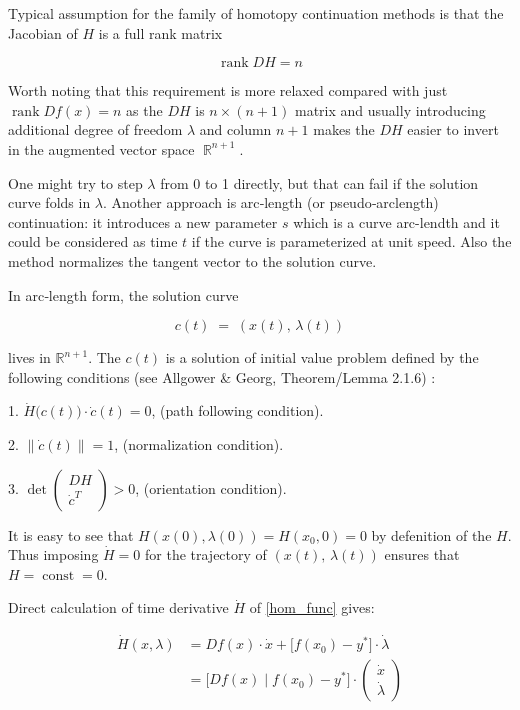 \documentclass[11pt,american]{article}
\DeclareMathOperator{\const}{const}
\DeclareMathOperator{\R}{\mathbb{R}}
\DeclareMathOperator{\rank}{\operatorname{rank}}
\begin{document}
Typical assumption for the family of homotopy continuation methods is that the Jacobian of $H$ is a full rank matrix

\begin{equation}\label{full_rank_H}
\rank D H = n
\end{equation}

Worth noting that this requirement is more relaxed compared with just $\rank D f(x) = n$ as the $D H$ is $n\times(n+1)$ matrix and usually introducing additional degree of freedom $\lambda$ and column $n+1$ makes the $D H$ easier to invert in the augmented vector space $\R^{n+1}$.

One might try to step $\lambda$ from 0 to 1 directly, but that can fail if the solution curve folds in $\lambda$.  
Another approach is arc‐length (or pseudo‐arclength) continuation: it introduces a new parameter $s$ which is a curve arc-lendth and it could be considered as time $t$ if the curve is parameterized at unit speed. Also the method normalizes the tangent vector to the solution curve.

In arc‐length form, the solution curve

\begin{equation}
c(t) \;=\; (x(t),\,\lambda(t))
\end{equation}

lives in $\mathbb{R}^{n+1}$. The $c(t)$ is a solution of initial value problem defined by the following conditions (see Allgower \& Georg, Theorem/Lemma 2.1.6) :

1. $ \dot H\bigl(c(t)\bigr) \cdot \dot{c}(t) = 0$, (path following condition).

2. $\|\dot{c}(t)\| = 1$, (normalization condition).

3. $\det \begin{pmatrix} D H \\ \dot{c}^T \end{pmatrix} > 0$, (orientation condition).

It is easy to see that $H(x(0),\lambda(0))=H(x_0,0) = 0$ by defenition of the $H$. Thus imposing $\dot H = 0$ for the trajectory of $(x(t),\,\lambda(t))$ ensures that $H = \const = 0$.

Direct calculation of time derivative $\dot H$ of \eqref{hom_func} gives:

\begin{align}\label{diff_hom_func}
\dot H(x,\lambda) &= D f(x) \cdot \dot x + \bigl[ f(x_0) - y^* \bigr] \cdot \dot \lambda \\
&= \bigl[ D f(x) \; \big| \; f(x_0) - y^* \bigr] \cdot \begin{pmatrix} \dot x \\ \dot \lambda \end{pmatrix}
\end{align}
\end{document}

